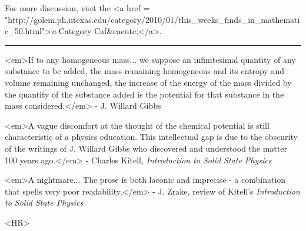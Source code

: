 For more discussion, visit the 
<a href = "http://golem.ph.utexas.edu/category/2010/01/this_weeks_finds_in_mathematic_50.html">\emph{n}-Category Caf&eacute;</a>.


\par\noindent\rule{\textwidth}{0.4pt}
<em>If to any homogeneous mass... we suppose an infinitesimal quantity
of any substance to be added, the mass remaining homogeneous and its
entropy and volume remaining unchanged, the increase of the energy of
the mass divided by the quantity of the substance added is the
potential for that substance in the mass considered.</em> - J. Willard
Gibbs

<em>A vague discomfort at the thought of the chemical potential is
still characteristic of a physics education.  This intellectual gap is
due to the obscurity of the writings of J. Willard Gibbs who
discovered and understood the matter 100 years ago.</em> - Charles
Kitell, \emph{Introduction to Solid State Physics}

<em>A nightmare... The prose is both laconic and imprecise - a
combination that spells very poor readability.</em> - J. Zrake, review
of Kitell's \emph{Introduction to Solid State Physics}

<HR>



